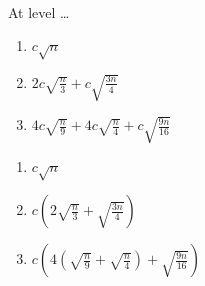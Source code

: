\documentclass{article}
\begin{document}
\begin{enumerate}
\begin{center}
              \\
              At level \dots
              \begin{multicols}{2}
                  \begin{enumerate}[label=\arabic*:]
                      \item \(c \sqrt{n}\)
                      \item \(2 c \sqrt{\frac{n}{3}} + c \sqrt{\frac{3n}{4}}\)
                      \item \(4c \sqrt{\frac{n}{9}} + 4c \sqrt{\frac{n}{4}} + c \sqrt{\frac{9n}{16}}\)
                  \end{enumerate}
                  \columnbreak
                  \begin{enumerate}[label=$\rightarrow$]
                      \item \(c \sqrt{n}\)
                      \item \(c( 2\sqrt{\frac{n}{3}} + \sqrt{\frac{3n}{4}})\)
                      \item \(c ( 4(\sqrt{\frac{n}{9}} + \sqrt{\frac{n}{4}}) + \sqrt{\frac{9n}{16}})\)
                  \end{enumerate}
              \end{multicols}


\end{center}
\end{enumerate}
\end{document}
